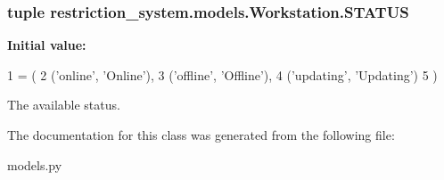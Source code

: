 \subsubsection[{S\+T\+A\+T\+U\+S}]{\setlength{\rightskip}{0pt plus 5cm}tuple restriction\+\_\+system.\+models.\+Workstation.\+S\+T\+A\+T\+U\+S\hspace{0.3cm}{\ttfamily [static]}}\label{classrestriction__system_1_1models_1_1Workstation_a7e10695b3519a406f1c6f605abd10573}
{\bfseries Initial value\+:}
\begin{DoxyCode}
1 = (
2         (\textcolor{stringliteral}{'online'}, \textcolor{stringliteral}{'Online'}),
3         (\textcolor{stringliteral}{'offline'}, \textcolor{stringliteral}{'Offline'}),
4         (\textcolor{stringliteral}{'updating'}, \textcolor{stringliteral}{'Updating'})
5         )
\end{DoxyCode}


The available status. 



The documentation for this class was generated from the following file\+:\begin{DoxyCompactItemize}
\item 
models.\+py\end{DoxyCompactItemize}
